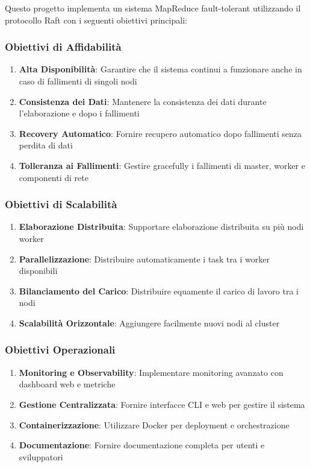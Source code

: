 \documentclass[12pt,a4paper]{article}
\begin{document}
Questo progetto implementa un sistema MapReduce fault-tolerant utilizzando il protocollo Raft con i seguenti obiettivi principali:

\subsubsection{Obiettivi di Affidabilità}

\begin{enumerate}
\item \textbf{Alta Disponibilità}: Garantire che il sistema continui a funzionare anche in caso di fallimenti di singoli nodi
\item \textbf{Consistenza dei Dati}: Mantenere la consistenza dei dati durante l'elaborazione e dopo i fallimenti
\item \textbf{Recovery Automatico}: Fornire recupero automatico dopo fallimenti senza perdita di dati
\item \textbf{Tolleranza ai Fallimenti}: Gestire gracefully i fallimenti di master, worker e componenti di rete
\end{enumerate}

\subsubsection{Obiettivi di Scalabilità}

\begin{enumerate}
\item \textbf{Elaborazione Distribuita}: Supportare elaborazione distribuita su più nodi worker
\item \textbf{Parallelizzazione}: Distribuire automaticamente i task tra i worker disponibili
\item \textbf{Bilanciamento del Carico}: Distribuire equamente il carico di lavoro tra i nodi
\item \textbf{Scalabilità Orizzontale}: Aggiungere facilmente nuovi nodi al cluster
\end{enumerate}

\subsubsection{Obiettivi Operazionali}

\begin{enumerate}
\item \textbf{Monitoring e Observability}: Implementare monitoring avanzato con dashboard web e metriche
\item \textbf{Gestione Centralizzata}: Fornire interfacce CLI e web per gestire il sistema
\item \textbf{Containerizzazione}: Utilizzare Docker per deployment e orchestrazione
\item \textbf{Documentazione}: Fornire documentazione completa per utenti e sviluppatori
\end{enumerate}
\end{document}
